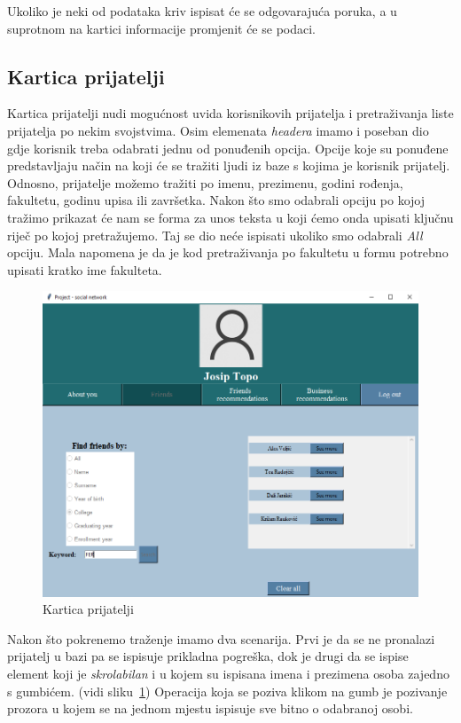\documentclass[titlepage, 12pt]{scrartcl}
\begin{document}
	Ukoliko je neki od podataka kriv ispisat će se odgovarajuća poruka, a u suprotnom na kartici informacije promjenit će se podaci. 
	
	\subsection{Kartica prijatelji}
	
	Kartica prijatelji nudi mogućnost uvida korisnikovih prijatelja i pretraživanja liste prijatelja po nekim svojstvima.
	Osim elemenata \emph{headera} imamo i poseban dio gdje korisnik treba odabrati jednu od ponuđenih opcija. Opcije koje su ponuđene predstavljaju način na koji će se tražiti ljudi iz baze s kojima je korisnik prijatelj. Odnosno, prijatelje možemo tražiti po imenu, prezimenu, godini rođenja, fakultetu, godinu upisa ili završetka. Nakon što smo odabrali opciju po kojoj tražimo prikazat će nam se forma za unos teksta u koji ćemo onda upisati ključnu riječ po kojoj pretražujemo. Taj se dio neće ispisati ukoliko smo odabrali \emph{All} opciju. Mala napomena je da je kod pretraživanja po fakultetu u formu potrebno upisati kratko ime fakulteta.
	
	
	\begin{figure}
		\begin{center}
			\includegraphics[scale=0.5]{slike/search.png}
			\caption{Kartica prijatelji}
			\label{fig:search} 
		\end{center}
	\end{figure}
	
	Nakon što pokrenemo traženje imamo dva scenarija. Prvi je da se ne pronalazi prijatelj u bazi pa se ispisuje prikladna pogreška, dok je drugi da se ispise element koji je \emph{skrolabilan} i u kojem su ispisana imena i prezimena osoba zajedno s gumbićem. (vidi sliku~\ref{fig:search}) Operacija koja se poziva klikom na gumb je pozivanje prozora u kojem se na jednom mjestu ispisuje sve bitno o odabranoj osobi.
	
\end{document}
